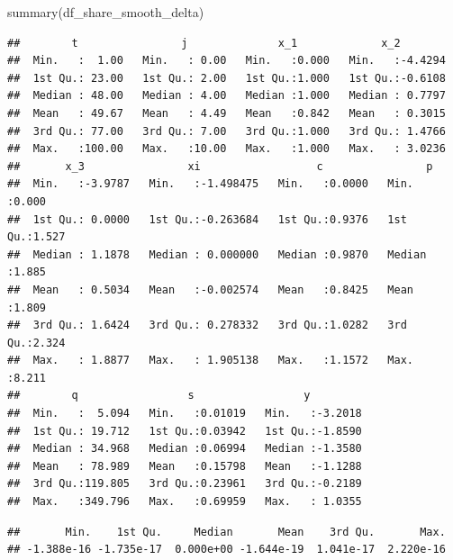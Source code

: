 \documentclass[
]{book}
\newenvironment{Shaded}{\begin{snugshade}}{\end{snugshade}}
\newcommand{\FunctionTok}[1]{\textcolor[rgb]{0.00,0.00,0.00}{#1}}
\newcommand{\NormalTok}[1]{#1}
\newcommand{\SpecialCharTok}[1]{\textcolor[rgb]{0.00,0.00,0.00}{#1}}
\begin{document}
\begin{Shaded}
\begin{Highlighting}[]
\FunctionTok{summary}\NormalTok{(df\_share\_smooth\_delta)}
\end{Highlighting}
\end{Shaded}

\begin{verbatim}
##        t                j              x_1             x_2         
##  Min.   :  1.00   Min.   : 0.00   Min.   :0.000   Min.   :-4.4294  
##  1st Qu.: 23.00   1st Qu.: 2.00   1st Qu.:1.000   1st Qu.:-0.6108  
##  Median : 48.00   Median : 4.00   Median :1.000   Median : 0.7797  
##  Mean   : 49.67   Mean   : 4.49   Mean   :0.842   Mean   : 0.3015  
##  3rd Qu.: 77.00   3rd Qu.: 7.00   3rd Qu.:1.000   3rd Qu.: 1.4766  
##  Max.   :100.00   Max.   :10.00   Max.   :1.000   Max.   : 3.0236  
##       x_3                xi                  c                p        
##  Min.   :-3.9787   Min.   :-1.498475   Min.   :0.0000   Min.   :0.000  
##  1st Qu.: 0.0000   1st Qu.:-0.263684   1st Qu.:0.9376   1st Qu.:1.527  
##  Median : 1.1878   Median : 0.000000   Median :0.9870   Median :1.885  
##  Mean   : 0.5034   Mean   :-0.002574   Mean   :0.8425   Mean   :1.809  
##  3rd Qu.: 1.6424   3rd Qu.: 0.278332   3rd Qu.:1.0282   3rd Qu.:2.324  
##  Max.   : 1.8877   Max.   : 1.905138   Max.   :1.1572   Max.   :8.211  
##        q                 s                 y          
##  Min.   :  5.094   Min.   :0.01019   Min.   :-3.2018  
##  1st Qu.: 19.712   1st Qu.:0.03942   1st Qu.:-1.8590  
##  Median : 34.968   Median :0.06994   Median :-1.3580  
##  Mean   : 78.989   Mean   :0.15798   Mean   :-1.1288  
##  3rd Qu.:119.805   3rd Qu.:0.23961   3rd Qu.:-0.2189  
##  Max.   :349.796   Max.   :0.69959   Max.   : 1.0355
\end{verbatim}

\begin{Shaded}
\end{Shaded}

\begin{verbatim}
##       Min.    1st Qu.     Median       Mean    3rd Qu.       Max. 
## -1.388e-16 -1.735e-17  0.000e+00 -1.644e-19  1.041e-17  2.220e-16
\end{verbatim}
\end{document}
